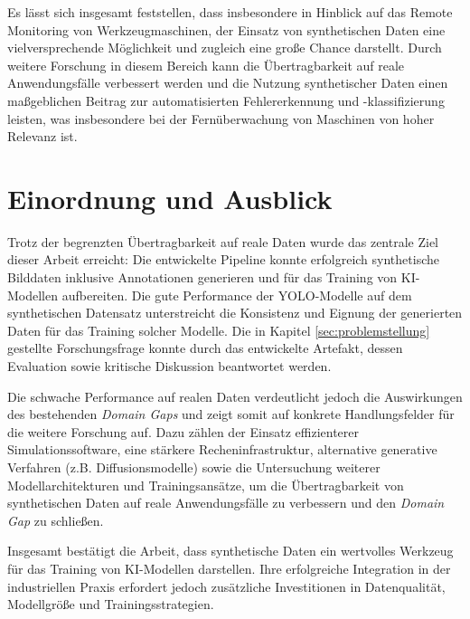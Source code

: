 Es lässt sich insgesamt feststellen, dass insbesondere in Hinblick auf das Remote Monitoring von Werkzeugmaschinen, der Einsatz von synthetischen Daten eine vielversprechende Möglichkeit und zugleich eine große Chance darstellt. Durch weitere Forschung in diesem Bereich kann die Übertragbarkeit auf reale Anwendungsfälle verbessert werden und die Nutzung synthetischer Daten einen maßgeblichen Beitrag zur automatisierten Fehlererkennung und -klassifizierung leisten, was insbesondere bei der Fernüberwachung von Maschinen von hoher Relevanz ist.

\section{Einordnung und Ausblick}
Trotz der begrenzten Übertragbarkeit auf reale Daten wurde das zentrale Ziel dieser Arbeit erreicht: Die entwickelte Pipeline konnte erfolgreich synthetische Bilddaten inklusive Annotationen generieren und für das Training von \ac{KI}-Modellen aufbereiten. Die gute Performance der \ac{YOLO}-Modelle auf dem synthetischen Datensatz unterstreicht die Konsistenz und Eignung der generierten Daten für das Training solcher Modelle. Die in Kapitel \ref{sec:problemstellung} gestellte Forschungsfrage konnte durch das entwickelte Artefakt, dessen Evaluation sowie kritische Diskussion beantwortet werden.

Die schwache Performance auf realen Daten verdeutlicht jedoch die Auswirkungen des bestehenden \textit{Domain Gaps} und zeigt somit auf konkrete Handlungsfelder für die weitere Forschung auf. Dazu zählen der Einsatz effizienterer Simulationssoftware, eine stärkere Recheninfrastruktur, alternative generative Verfahren (z.B. Diffusionsmodelle) sowie die Untersuchung weiterer Modellarchitekturen und Trainingsansätze, um die Übertragbarkeit von synthetischen Daten auf reale Anwendungsfälle zu verbessern und den \textit{Domain Gap} zu schließen.

Insgesamt bestätigt die Arbeit, dass synthetische Daten ein wertvolles Werkzeug für das Training von \ac{KI}-Modellen darstellen. Ihre erfolgreiche Integration in der industriellen Praxis erfordert jedoch zusätzliche Investitionen in Datenqualität, Modellgröße und Trainingsstrategien.
